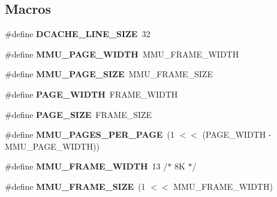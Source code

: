 \subsection*{Macros}
\begin{DoxyCompactItemize}
\item 
\mbox{\label{group__RTEMSBSPsSPARC64mm_ga6b88acb101796ba8a1dda839c177d0ff}} 
\#define {\bfseries D\+C\+A\+C\+H\+E\+\_\+\+L\+I\+N\+E\+\_\+\+S\+I\+ZE}~32
\item 
\mbox{\label{group__RTEMSBSPsSPARC64mm_ga130b21bdc5aa9f301d4aad9805736e45}} 
\#define {\bfseries M\+M\+U\+\_\+\+P\+A\+G\+E\+\_\+\+W\+I\+D\+TH}~M\+M\+U\+\_\+\+F\+R\+A\+M\+E\+\_\+\+W\+I\+D\+TH
\item 
\mbox{\label{group__RTEMSBSPsSPARC64mm_ga24c8bb65b3961c65e05586a4f45ca1d8}} 
\#define {\bfseries M\+M\+U\+\_\+\+P\+A\+G\+E\+\_\+\+S\+I\+ZE}~M\+M\+U\+\_\+\+F\+R\+A\+M\+E\+\_\+\+S\+I\+ZE
\item 
\mbox{\label{group__RTEMSBSPsSPARC64mm_ga1a432f11437f7b08854605935f6a4084}} 
\#define {\bfseries P\+A\+G\+E\+\_\+\+W\+I\+D\+TH}~F\+R\+A\+M\+E\+\_\+\+W\+I\+D\+TH
\item 
\mbox{\label{group__RTEMSBSPsSPARC64mm_ga7d467c1d283fdfa1f2081ba1e0d01b6e}} 
\#define {\bfseries P\+A\+G\+E\+\_\+\+S\+I\+ZE}~F\+R\+A\+M\+E\+\_\+\+S\+I\+ZE
\item 
\mbox{\label{group__RTEMSBSPsSPARC64mm_ga3f974207838fa9b55e0d687c722fffb4}} 
\#define {\bfseries M\+M\+U\+\_\+\+P\+A\+G\+E\+S\+\_\+\+P\+E\+R\+\_\+\+P\+A\+GE}~(1 $<$$<$ (P\+A\+G\+E\+\_\+\+W\+I\+D\+TH -\/ M\+M\+U\+\_\+\+P\+A\+G\+E\+\_\+\+W\+I\+D\+TH))
\item 
\mbox{\label{group__RTEMSBSPsSPARC64mm_ga490dc6991adafe379bdbba515233a150}} 
\#define {\bfseries M\+M\+U\+\_\+\+F\+R\+A\+M\+E\+\_\+\+W\+I\+D\+TH}~13	/$\ast$ 8\+K $\ast$/
\item 
\mbox{\label{group__RTEMSBSPsSPARC64mm_ga8a4e0c689ce2c16cb1e19b7c52da9df4}} 
\#define {\bfseries M\+M\+U\+\_\+\+F\+R\+A\+M\+E\+\_\+\+S\+I\+ZE}~(1 $<$$<$ M\+M\+U\+\_\+\+F\+R\+A\+M\+E\+\_\+\+W\+I\+D\+TH)

\end{DoxyCompactItemize}
